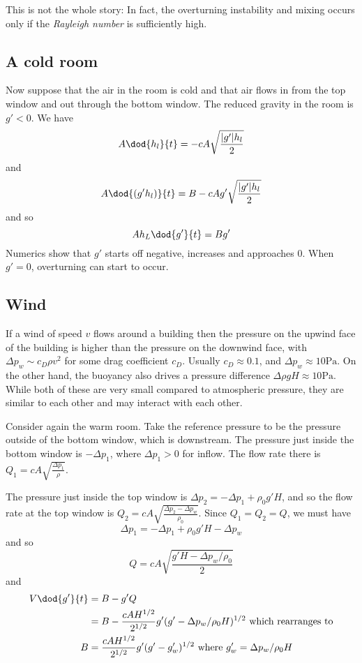 This is not the whole story: In fact, the overturning instability and mixing
occurs only if the \textit{Rayleigh number} is sufficiently high. 

\subsection{A cold room}

Now suppose that the air in the room is cold and that air flows in from the top
window and out through the bottom window. The reduced gravity in the room is
$g' < 0$. We have
\begin{equation}
    A \dod{h_l}{t} = -cA\sqrt{\frac{|g'| h_l}{2}}
\end{equation}
and
\begin{equation}
    A \dod{(g' h_l)}{t} = B - cA g' \sqrt{\frac{|g'|h_l}{2}}
\end{equation}
and so 
\begin{equation}
    A h_L \dod{g'}{t} = B g'
\end{equation}
Numerics show that $g'$ starts off negative, increases and approaches 0. When
$g'=0$, overturning can start to occur.

\subsection{Wind}

If a wind of speed $v$ flows around a building then the pressure on the upwind
face of the building is higher than the pressure on the downwind face, with
$\Delta p_w \sim c_D\rho v^2$ for some drag coefficient $c_D$. Usually $c_D
\approx 0.1$, and $\Delta p_w \approx 10\mathrm{Pa}$. On the other hand, the
buoyancy also drives a pressure difference $\Delta\rho gH \approx
10\mathrm{Pa}$. While both of these are very small compared to atmospheric
pressure, they are similar to each other and may interact with each other. 

Consider again the warm room. Take the reference pressure to be the pressure
outside of the bottom window, which is downstream. The pressure just inside the
bottom window is $-\Delta p_1$, where $\Delta p_1 > 0$ for inflow. The flow rate
there is $Q_1=cA\sqrt{\frac{\Delta p_1}{\rho}}$. 

The pressure just inside the top window is $\Delta p_2 = -\Delta p_1 + \rho_0 g'
H$, and so the flow rate at the top window is $Q_2=cA\sqrt{\frac{\Delta p_2-\Delta p_w}{\rho_0}}$.
Since $Q_1 = Q_2 = Q$, we must have
\begin{equation}
    \Delta p_1 = -\Delta p_1 + \rho_0 g' H - \Delta p_w
\end{equation}
and so
\begin{equation}
    Q = cA \sqrt{\frac{ g'H - \Delta p_w / \rho_0}{2}}
\end{equation}
and
\begin{align}
    V \dod{g'}{t} &= B - g' Q \\
                  &= B - \frac{cAH^{1/2}}{2^{1/2}} g' (g' - \Delta p_w/\rho_0H)^{1/2} \text{ which rearranges to} \\
    B &= \frac{cAH^{1/2}}{2^{1/2}} g' (g' - g'_w)^{1/2} \text{ where } g'_w = \Delta p_w/\rho_0H
\end{align}

